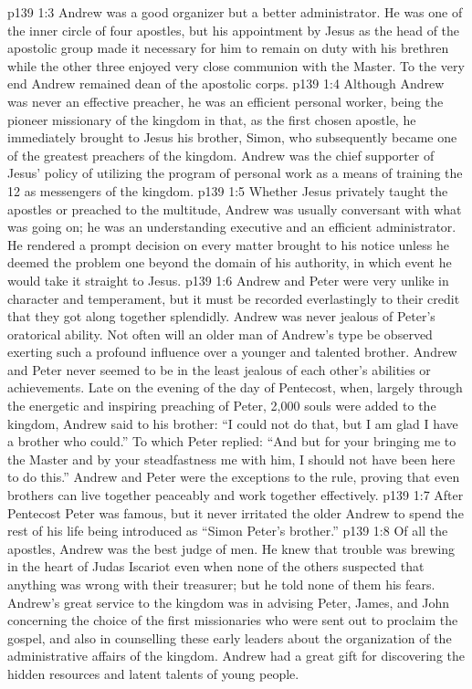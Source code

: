 \vs p139 1:3 \pc Andrew was a good organizer but a better administrator. He was one of the inner circle of four apostles, but his appointment by Jesus as the head of the apostolic group made it necessary for him to remain on duty with his brethren while the other three enjoyed very close communion with the Master. To the very end Andrew remained dean of the apostolic corps.
\vs p139 1:4 Although Andrew was never an effective preacher, he was an efficient personal worker, being the pioneer missionary of the kingdom in that, as the first chosen apostle, he immediately brought to Jesus his brother, Simon, who subsequently became one of the greatest preachers of the kingdom. Andrew was the chief supporter of Jesus’ policy of utilizing the program of personal work as a means of training the 12 as messengers of the kingdom.
\vs p139 1:5 Whether Jesus privately taught the apostles or preached to the multitude, Andrew was usually conversant with what was going on; he was an understanding executive and an efficient administrator. He rendered a prompt decision on every matter brought to his notice unless he deemed the problem one beyond the domain of his authority, in which event he would take it straight to Jesus.
\vs p139 1:6 \pc Andrew and Peter were very unlike in character and temperament, but it must be recorded everlastingly to their credit that they got along together splendidly. Andrew was never jealous of Peter’s oratorical ability. Not often will an older man of Andrew’s type be observed exerting such a profound influence over a younger and talented brother. Andrew and Peter never seemed to be in the least jealous of each other’s abilities or achievements. Late on the evening of the day of Pentecost, when, largely through the energetic and inspiring preaching of Peter, 2,000 souls were added to the kingdom, Andrew said to his brother: “I could not do that, but I am glad I have a brother who could.” To which Peter replied: “And but for your bringing me to the Master and by your steadfastness  me with him, I should not have been here to do this.” Andrew and Peter were the exceptions to the rule, proving that even brothers can live together peaceably and work together effectively.
\vs p139 1:7 After Pentecost Peter was famous, but it never irritated the older Andrew to spend the rest of his life being introduced as “Simon Peter’s brother.”
\vs p139 1:8 \pc Of all the apostles, Andrew was the best judge of men. He knew that trouble was brewing in the heart of Judas Iscariot even when none of the others suspected that anything was wrong with their treasurer; but he told none of them his fears. Andrew’s great service to the kingdom was in advising Peter, James, and John concerning the choice of the first missionaries who were sent out to proclaim the gospel, and also in counselling these early leaders about the organization of the administrative affairs of the kingdom. Andrew had a great gift for discovering the hidden resources and latent talents of young people.
